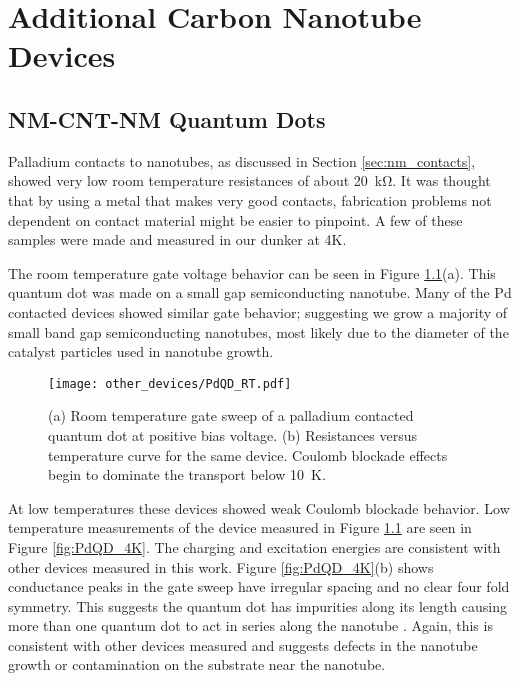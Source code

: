 \chapter{Additional Carbon Nanotube Devices}
\label{sec:other_devices}

\section{NM-CNT-NM Quantum Dots}

Palladium contacts to nanotubes, as discussed in Section \ref{sec:nm_contacts}, showed very low room temperature resistances of about \SI{20}{\kilo\ohm}. It was thought that by using a metal that makes very good contacts, fabrication problems not dependent on contact material might be easier to pinpoint. A few of these samples were made and measured in our dunker at 4K. 

The room temperature gate voltage behavior can be seen in Figure \ref{fig:PdQD_rt}(a). This quantum dot was made on a small gap semiconducting nanotube. Many of the Pd contacted devices showed similar gate behavior; suggesting we grow a majority of small band gap semiconducting nanotubes, most likely due to the diameter of the catalyst particles used in nanotube growth.

\begin{figure}
    \centering
    \texttt{[image: other\_devices/PdQD\_RT.pdf]}
    \caption{(a) Room temperature gate sweep of a palladium contacted quantum dot at positive bias voltage. (b) Resistances versus temperature curve for the same device. Coulomb blockade effects begin to dominate the transport below \SI{10}{\kelvin}.}
    \label{fig:PdQD_rt}
\end{figure}

At low temperatures these devices showed weak Coulomb blockade behavior. Low temperature measurements of the device measured in Figure \ref{fig:PdQD_rt} are seen in Figure \ref{fig:PdQD_4K}. The charging and excitation energies are consistent with other devices measured in this work. Figure \ref{fig:PdQD_4K}(b) shows conductance peaks in the gate sweep have irregular spacing and no clear four fold symmetry. This suggests the quantum dot has impurities along its length causing more than one quantum dot to act in series along the nanotube \cite{Bockrath2001}. Again, this is consistent with other devices measured and suggests defects in the nanotube growth or contamination on the substrate near the nanotube.

